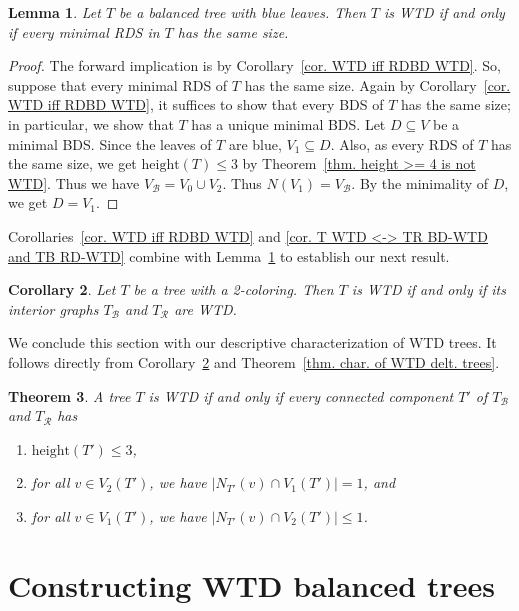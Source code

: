 \documentclass[12pt, reqno]{amsart}
\theoremstyle{definition}
\theoremstyle{plain}
\newtheorem{theorem}{Theorem}[section]
\newtheorem{lemma}[theorem]{Lemma}
\newtheorem{corollary}[theorem]{Corollary}
\theoremstyle{definition}
\newcommand{\hh}{\mbox{height}}
\newcommand{\R}{\mathcal{R}}
\newcommand{\B}{\mathcal{B}}
\begin{document}
\begin{lemma}\label{lem. T WTD <-> T RD-WTD}
    Let $T$ be a balanced tree with blue leaves.
    Then $T$ is WTD if and only if every minimal RDS in $T$ has the same size. 
\end{lemma}

\begin{proof}
    The forward implication is by Corollary~\ref{cor. WTD iff RDBD WTD}.
    So, suppose that every minimal RDS of $T$ has the same size.
    Again by Corollary~\ref{cor. WTD iff RDBD WTD}, it suffices to show that every BDS of $T$ has the same size; in particular, we show that $T$ has a unique minimal BDS.
    Let $D \subseteq V$ be a minimal BDS.
    Since the leaves of $T$ are blue, $V_1 \subseteq D$.
    Also, as every RDS of $T$ has the same size, we get $\hh(T) \leq 3$ by Theorem~\ref{thm. height >= 4 is not WTD}. 
    Thus we have $V_\B = V_0 \cup V_2$.
    Thus $N(V_1) = V_\B$.
    By the minimality of $D$, we get $D = V_1$.
\end{proof}

Corollaries~\ref{cor. WTD iff RDBD WTD} and \ref{cor. T WTD <-> TR BD-WTD and TB RD-WTD} combine with Lemma~\ref{lem. T WTD <-> T RD-WTD} to establish our next result.

\begin{corollary}\label{cor. T WTD <-> TBTR WTD}
    Let $T$ be a tree with a 2-coloring.
    Then $T$ is WTD if and only if its interior graphs $T_\B$ and $T_\R$ are WTD.
\end{corollary}
    

We conclude this section with our descriptive characterization of WTD trees.
It follows directly from Corollary~\ref{cor. T WTD <-> TBTR WTD} and Theorem~\ref{thm. char. of WTD delt. trees}.

\begin{theorem}\label{thm. char. of WTD trees}
    A tree $T$ is WTD if and only if every connected component $T'$ of $T_\B$ and $T_\R$ has
    \begin{enumerate}
        \item $\hh(T') \leq 3$,
        \item for all $v \in V_2(T')$, we have $|N_{T'}(v) \cap V_1(T')| = 1$, and
        \item for all $v \in V_1(T')$, we have $|N_{T'}(v) \cap V_2(T')| \leq 1$.
    \end{enumerate}
\end{theorem}

\section{Constructing WTD balanced trees}\label{sec. const. WTD bal. trees}
\end{document}
